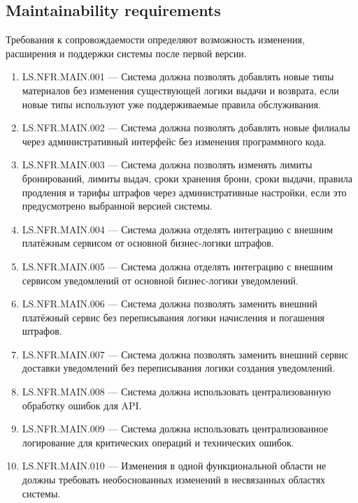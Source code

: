 \documentclass[12pt,a4paper]{article}
\begin{document}
	\subsection{Maintainability requirements}
	
	Требования к сопровождаемости определяют возможность изменения, расширения
	и поддержки системы после первой версии.
	
	\begin{enumerate}
		\item LS.NFR.MAIN.001 --- Система должна позволять добавлять новые типы
		материалов без изменения существующей логики выдачи и возврата, если новые
		типы используют уже поддерживаемые правила обслуживания.
		
		\item LS.NFR.MAIN.002 --- Система должна позволять добавлять новые филиалы
		через административный интерфейс без изменения программного кода.
		
		\item LS.NFR.MAIN.003 --- Система должна позволять изменять лимиты бронирований,
		лимиты выдач, сроки хранения брони, сроки выдачи, правила продления и тарифы
		штрафов через административные настройки, если это предусмотрено выбранной
		версией системы.
		
		\item LS.NFR.MAIN.004 --- Система должна отделять интеграцию с внешним платёжным
		сервисом от основной бизнес-логики штрафов.
		
		\item LS.NFR.MAIN.005 --- Система должна отделять интеграцию с внешним сервисом
		уведомлений от основной бизнес-логики уведомлений.
		
		\item LS.NFR.MAIN.006 --- Система должна позволять заменить внешний платёжный
		сервис без переписывания логики начисления и погашения штрафов.
		
		\item LS.NFR.MAIN.007 --- Система должна позволять заменить внешний сервис
		доставки уведомлений без переписывания логики создания уведомлений.
		
		\item LS.NFR.MAIN.008 --- Система должна использовать централизованную обработку
		ошибок для API.
		
		\item LS.NFR.MAIN.009 --- Система должна использовать централизованное логирование
		для критических операций и технических ошибок.
		
		\item LS.NFR.MAIN.010 --- Изменения в одной функциональной области не должны
		требовать необоснованных изменений в несвязанных областях системы.
	\end{enumerate}
	
\end{document}
